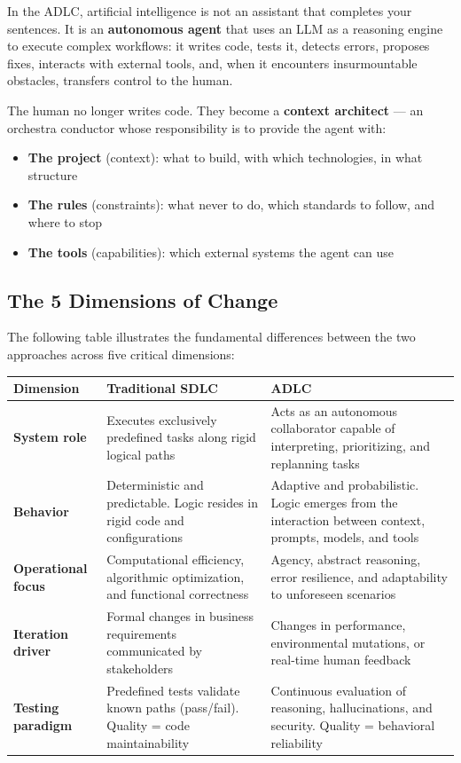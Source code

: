 In the ADLC, artificial intelligence is not an assistant that completes your sentences. It is an \textbf{autonomous agent} that uses an LLM as a reasoning engine~\cite{anthropic:agents} to execute complex workflows: it writes code, tests it, detects errors, proposes fixes, interacts with external tools, and, when it encounters insurmountable obstacles, transfers control to the human.

The human no longer writes code. They become a \textbf{context architect} --- an orchestra conductor whose responsibility is to provide the agent with:

\begin{itemize}
  \item \textbf{The project} (context): what to build, with which technologies, in what structure
  \item \textbf{The rules} (constraints): what never to do, which standards to follow, and where to stop
  \item \textbf{The tools} (capabilities): which external systems the agent can use
\end{itemize}

\subsection*{The 5 Dimensions of Change}

The following table illustrates the fundamental differences between the two approaches across five critical dimensions:

\begin{small}
\begin{longtable}{p{2.5cm} p{5cm} p{5.5cm}}
\toprule
\textbf{Dimension} & \textbf{Traditional SDLC} & \textbf{ADLC} \\
\midrule
\endhead
\textbf{System role} & Executes exclusively predefined tasks along rigid logical paths & Acts as an autonomous collaborator capable of interpreting, prioritizing, and replanning tasks \\
\midrule
\textbf{Behavior} & Deterministic and predictable. Logic resides in rigid code and configurations & Adaptive and probabilistic. Logic emerges from the interaction between context, prompts, models, and tools \\
\midrule
\textbf{Operational focus} & Computational efficiency, algorithmic optimization, and functional correctness & Agency, abstract reasoning, error resilience, and adaptability to unforeseen scenarios \\
\midrule
\textbf{Iteration driver} & Formal changes in business requirements communicated by stakeholders & Changes in performance, environmental mutations, or real-time human feedback \\
\midrule
\textbf{Testing paradigm} & Predefined tests validate known paths (pass/fail). Quality = code maintainability & Continuous evaluation of reasoning, hallucinations, and security. Quality = behavioral reliability \\
\bottomrule
\end{longtable}
\end{small}

